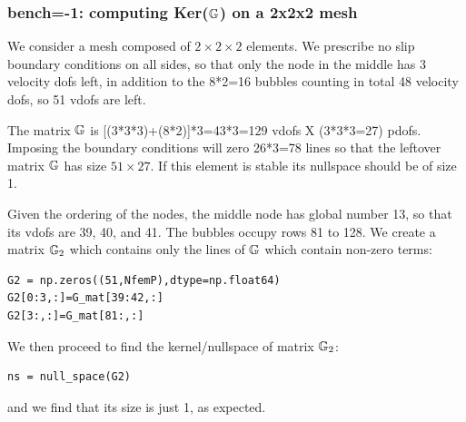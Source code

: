 \subsubsection*{bench=-1: computing Ker(${\mathbb{G}}$) on a 2x2x2 mesh}

We consider a mesh composed of $2\times 2\times 2$ elements. We prescribe no slip boundary conditions 
on all sides, so that only the node in the middle has 3 velocity dofs left, in addition 
to the 8*2=16 bubbles counting in total 48 velocity dofs, so 51 vdofs are left.

The matrix ${\mathbb{G}}$ is [(3*3*3)+(8*2)]*3=43*3=129 vdofs X (3*3*3=27) pdofs. 
Imposing the boundary conditions will zero 26*3=78 lines so that the leftover matrix ${\mathbb{G}}$
has size $51\times 27$. If this element is stable its nullspace should be of size 1. 

Given the ordering of the nodes, the middle node has global number 13, so that 
its vdofs are 39, 40, and 41. The bubbles occupy rows 81 to 128. 
We create a matrix ${\mathbb{G}}_2$ which contains only the lines of ${\mathbb{G}}$ which contain non-zero terms:
\begin{lstlisting}
G2 = np.zeros((51,NfemP),dtype=np.float64)
G2[0:3,:]=G_mat[39:42,:] 
G2[3:,:]=G_mat[81:,:]    
\end{lstlisting}
We then proceed to find the kernel/nullspace of matrix ${\mathbb{G}}_2$:
\begin{lstlisting}
ns = null_space(G2)
\end{lstlisting}
and we find that its size is just 1, as expected. 












